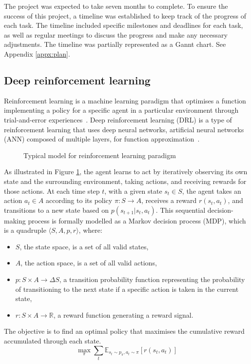 The project was expected to take seven months to complete. To ensure the success of this project, a timeline was established to keep track of the progress of each task. The timeline included specific milestones and deadlines for each task, as well as regular meetings to discuss the progress and make any necessary adjustments. The timeline was partially represented as a Gannt chart. See Appendix \ref{appx:plan}.



\subsection{Deep reinforcement learning} \label{subsec:drl}

Reinforcement learning is a machine learning paradigm that optimises a function implementing a policy for a specific agent in a particular environment through trial-and-error experiences~\cite{ref:spinning-up}. Deep reinforcement learning (DRL) is a type of reinforcement learning that uses deep neural networks, artificial neural networks (ANN) composed of multiple layers, for function approximation~\cite{ref:dqn}.

\begin{figure}[htbp]
\centering

\caption{Typical model for reinforcement learning paradigm \cite{ref:spec-report}}
\label{fig:agent-env-interaction}
\end{figure}

As illustrated in Figure \ref{fig:agent-env-interaction}, the agent learns to act by iteratively observing its own state and the surrounding environment, taking actions, and receiving rewards for those actions. At each time step $t$, with a given state $s_t \in S$, the agent takes an action $a_t \in A$ according to its policy $\pi \colon S \to A$, receives a reward $r(s_t, a_t)$, and transitions to a new state based on $p(s_{t+1}|s_t, a_t)$. This sequential decision-making process is formally modelled as a Markov decision process (MDP), which is a quadruple $\langle S, A, p, r \rangle$, where:
\begin{itemize}
\item $S$, the state space, is a set of all valid states,
\item $A$, the action space, is a set of all valid actions,
\item $p \colon S \times A \to \Delta S$, a transition probability function representing the probability of transitioning to the next state if a specific action is taken in the current state,
\item $r \colon S \times A \to \mathbb{R}$, a reward function generating a reward signal.
\end{itemize}
The objective is to find an optimal policy that maximises the cumulative reward accumulated through each state.
\begin{displaymath}
\max_{\pi} \sum_{t} \mathbb{E}_{s_t \sim p_\pi, a_t \sim \pi} \left[ r(s_t,a_t) \right]
\end{displaymath}

